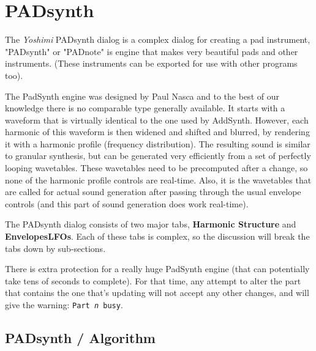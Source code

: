 %
%
%

\section{PADsynth}
\label{sec:padsynth}

   The \textsl{Yoshimi} PADsynth dialog is a complex dialog for creating a
   pad instrument,  "PADsynth" or "PADnote" is engine that makes very
   beautiful pads and other instruments. (These instruments can be exported
   for use with other programs too).

   The PadSynth engine was designed by Paul Nasca and to the best of our
   knowledge there is no comparable type generally available. It starts with a
   waveform that is virtually identical to the one used by AddSynth. However,
   each harmonic of this waveform is then widened and shifted and blurred, by
   rendering it with a harmonic profile (frequency distribution). The resulting
   sound is similar to granular synthesis, but can be generated very
   efficiently from a set of perfectly looping wavetables. These wavetables
   need to be precomputed after a change, so none of the harmonic profile
   controls are real-time. Also, it is the wavetables that are called for
   actual sound generation after passing through the usual envelope controls
   (and this part of sound generation does work real-time).

   The PADsynth dialog consists of two major tabs,
   \textbf{Harmonic Structure} and \textbf{EnvelopesLFOs}.
   Each of these tabs is complex, so the discussion
   will break the tabs down by sub-sections.

   There is extra protection for a really huge PadSynth engine
   (that can potentially take tens of seconds to complete).
   For that time, any attempt to alter the part that contains the one
   that's updating will not accept any other changes,
   and will give the warning: \texttt{Part \textsl{n} busy}.

\subsection{PADsynth / Algorithm}
\label{subsec:padsynth_algorithm}

